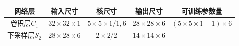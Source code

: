 \begin{longtable}[]{ ccccc }
\toprule
\begin{minipage}[b]{0.12\columnwidth}\centering\strut
网络层\strut
\end{minipage} & \begin{minipage}[b]{0.16\columnwidth}\centering\strut
输入尺寸\strut
\end{minipage} & \begin{minipage}[b]{0.19\columnwidth}\centering\strut
核尺寸\strut
\end{minipage} & \begin{minipage}[b]{0.16\columnwidth}\centering\strut
输出尺寸\strut
\end{minipage} & \begin{minipage}[b]{0.24\columnwidth}\centering\strut
可训练参数量\strut
\end{minipage}\tabularnewline
\midrule
\endhead
\begin{minipage}[t]{0.12\columnwidth}\centering\strut
卷积层\(C_1\)\strut
\end{minipage} & \begin{minipage}[t]{0.16\columnwidth}\centering\strut
\(32\times32\times1\)\strut
\end{minipage} & \begin{minipage}[t]{0.19\columnwidth}\centering\strut
\(5\times5\times1/1,6\)\strut
\end{minipage} & \begin{minipage}[t]{0.16\columnwidth}\centering\strut
\(28\times28\times6\)\strut
\end{minipage} & \begin{minipage}[t]{0.24\columnwidth}\centering\strut
\((5\times5\times1+1)\times6\)\strut
\end{minipage}\tabularnewline
\begin{minipage}[t]{0.12\columnwidth}\centering\strut
下采样层\(S_2\)\strut
\end{minipage} & \begin{minipage}[t]{0.16\columnwidth}\centering\strut
\(28\times28\times6\)\strut
\end{minipage} & \begin{minipage}[t]{0.19\columnwidth}\centering\strut
\(2\times2/2\)\strut
\end{minipage} & \begin{minipage}[t]{0.16\columnwidth}\centering\strut
\(14\times14\times6\)\strut
\end{minipage} & \begin{minipage}[t]{0.24\columnwidth}\centering\strut

\end{minipage}
\end{longtable}
